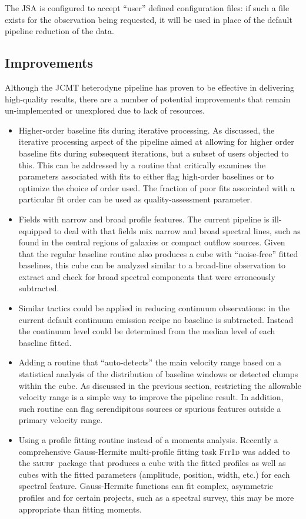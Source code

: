 \documentclass[useAMS,usenatbib]{mn2e}
\newcommand{\smurf}{\textsc{smurf}}
\begin{document}
The JSA is configured to accept ``user'' defined configuration files: if such
a file exists for the observation being requested, it will be used in place of the default
pipeline reduction of the data.

\subsection{Improvements}

Although the JCMT heterodyne pipeline has proven to be effective in delivering
high-quality results, there are a number of potential improvements that remain
un-implemented or unexplored due to lack of resources.

\begin{itemize}
\item  Higher-order baseline fits during iterative processing. As discussed, the
iterative processing aspect of the pipeline aimed at allowing for higher order
baseline fits during subsequent iterations, but a subset of users objected
to this. This can be addressed by a routine that critically examines the
parameters associated with fits to either flag high-order baselines
or to optimize the choice of order used. The fraction of poor fits associated
with a particular fit order can be used as quality-assessment parameter.
\item Fields with narrow and broad profile features.  The current pipeline
is ill-equipped to deal with that fields mix narrow and broad spectral
lines, such as found in the central regions of galaxies or compact
outflow sources. Given that the regular baseline routine also produces a
cube with ``noise-free'' fitted baselines, this cube can be analyzed similar to a
broad-line observation to extract and check for broad
spectral components that were erroneously subtracted.
\item Similar tactics could be applied in reducing continuum observations:
in the current default continuum emission recipe no baseline is subtracted. Instead the continuum
level could be determined from the median level of each baseline fitted.
\item Adding a routine that ``auto-detects'' the main velocity range based
on a statistical analysis of the distribution of baseline windows or detected clumps
within the cube. As discussed in the previous section, restricting the allowable
velocity range is a simple way to improve the pipeline result. In addition,
such routine can flag serendipitous sources or spurious features outside
a primary velocity range.
\item Using a profile fitting routine instead of a moments analysis. Recently a
comprehensive Gauss-Hermite multi-profile fitting task \textsc{Fit{\footnotesize{1}}d}
was added to the \smurf\ package that produces a cube with the fitted profiles as well
as cubes with the fitted parameters (amplitude, position, width, etc.) for
each spectral feature. Gauss-Hermite functions can fit complex, asymmetric
profiles and for certain projects, such as a spectral survey, this may be more
appropriate than fitting moments.
\end{itemize}
\end{document}
